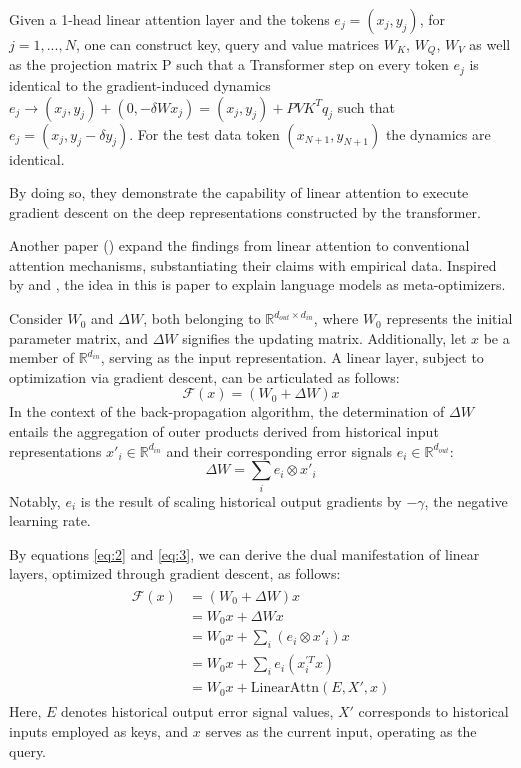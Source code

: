 \documentclass[11pt]{article}
\begin{document}
Given a 1-head linear attention layer and
the tokens $e_{j} = (x_{j},y_{j})$, for $j = 1, . . . , N$, one can construct key, query and value matrices $W_{K}$, $W_{Q}$, $W_{V}$ as well
as the projection matrix P such that a Transformer step on
every token $e_j$ is identical to the gradient-induced dynamics $e_j \rightarrow (x_j , y_j ) + (0, - \delta W x_j ) = (x_j , y_j ) + PVK^{T}q_j$
such that $e_j = (x_j , y_j - \delta y_j )$. For the test data token
$(x_{N+1}, y_{N+1})$ the dynamics are identical.

By doing so, they demonstrate the capability of linear attention to execute gradient descent on the deep representations constructed by the transformer.


Another paper (\cite{2022arXiv221210559D}) expand the findings from linear attention to conventional attention mechanisms, substantiating their claims with empirical data.
Inspired by \cite{Aizerman2019TheoreticalFO} and \cite{unknown}, the idea in this is paper to explain language models as meta-optimizers.

Consider $W_0$ and $\Delta W$, both belonging to $\mathbb{R}^{d_{out} \times d_{in}}$, where $W_0$ represents the initial parameter matrix, and $\Delta W$ signifies the updating matrix. Additionally, let $x$ be a member of $\mathbb{R}^{d_{in}}$, serving as the input representation. A linear layer, subject to optimization via gradient descent, can be articulated as follows:
\begin{equation}
	\mathcal{F}(x) = (W_0 + \Delta W)x \label{eq:2}
\end{equation}
In the context of the back-propagation algorithm, the determination of $\Delta W$ entails the aggregation of outer products derived from historical input representations $x'_i \in \mathbb{R}^{d_{in}}$ and their corresponding error signals $e_i \in \mathbb{R}^{d_{out}}$:
\begin{equation}
	\Delta W = \sum_{i} e_i \otimes x'_i \label{eq:3}
\end{equation}
Notably, $e_i$ is the result of scaling historical output gradients by $-\gamma$, the negative learning rate.

By equations \eqref{eq:2} and \eqref{eq:3}, we can derive the dual manifestation of linear layers, optimized through gradient descent, as follows:
\begin{align}
	\begin{split}
		\mathcal{F}(x) &= (W_0 + \Delta W)x \\
		&= W_0x + \Delta Wx \\
		&= W_0x + \sum_{i} (e_i \otimes x'_i)x \\
		&= W_0x + \sum_{i} e_i(x^{'T}_ix) \\
		&= W_0x + \text{LinearAttn}(E, X', x)
	\end{split}
	\label{eq:4}
\end{align}
Here, $E$ denotes historical output error signal values, $X'$ corresponds to historical inputs employed as keys, and $x$ serves as the current input, operating as the query.
\end{document}
